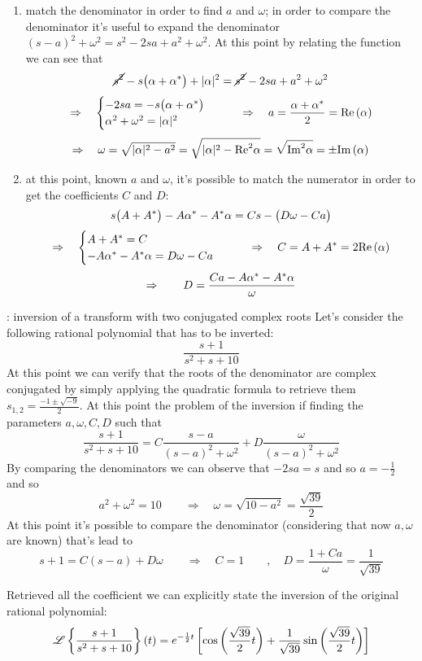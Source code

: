 	\begin{enumerate}
		\item match the denominator in order to find $a$ and $\omega$; in order to compare the denominator it's useful to expand the denominator $(s-a)^2 + \omega^2 = s^2  - 2sa + a^2 + \omega^2$. At this point by relating the function we can see that
		\[ \cancel {s^2} - s \big(\alpha+\alpha^*\big) + |\alpha|^2 = \cancel{s^2}  - 2sa + a^2 + \omega^2  \]
		\[ \Rightarrow \quad \begin{cases}
			-2sa = - s\big(\alpha + \alpha ^*\big) \\ \alpha^2+\omega^2 = |\alpha|^2 
		\end{cases} \qquad \Rightarrow \quad a = \frac{\alpha + \alpha^*}{2} = \textrm{Re}\left(\alpha\right) 	\]
		\[ \Rightarrow \quad \omega = \sqrt{|\alpha|^2-a^2}  = \sqrt{|\alpha|^2-\textrm{Re}^2\alpha} = \sqrt{\textrm{Im}^2\alpha} = \pm \textrm{Im}\left(\alpha\right)  \]
		
		\item at this point, known $a$ and $\omega$, it's possible to match the numerator in order to get the coefficients $C$ and $D$:
		\[ s\big(A+A^*\big) - A\alpha^* - A^*\alpha = Cs - \big(D\omega - Ca\big) \]
		\[ \Rightarrow \quad \begin{cases}
			A + A^* = C \\ -A\alpha^* - A^*\alpha = D\omega - Ca
		\end{cases} \qquad \Rightarrow \quad C = A+A^* = 2 \textrm{Re}\left(\alpha\right)\]
		\[ \Rightarrow \qquad D = \frac{Ca - A \alpha^*  - A^* \alpha}{\omega}  \]
	\end{enumerate}
	
	\begin{example}{: inversion of a transform with two conjugated complex roots}
		Let's consider the following rational polynomial that has to be inverted:
		\[ \frac{s+1}{s^2+s+10} \]
		At this point we can verify that the roots of the denominator are complex conjugated by simply applying the quadratic formula to retrieve them $s_{1,2} = \frac{-1\pm\sqrt{-9}}{2}$. At this point the problem of the inversion if finding the parameters $a,\omega,C,D$ such that
		\[ \frac{s+1}{s^2+s+10} = C \frac{s-a}{(s-a)^2+\omega^2} + D \frac{\omega}{(s-a)^2 + \omega^2} \]
		By comparing the denominators we can observe that $-2sa = s$ and so $a = -\frac 1 2$ and so 
		\[ a^2+ \omega^2 = 10 \qquad \Rightarrow \quad \omega = \sqrt{10-a^2} = \frac{\sqrt{39}}{2}\]
		At this point it's possible to compare the denominator (considering that now $a,\omega$ are known) that's lead to
		\[ s + 1 = C\left( s - a\right) + D\omega \qquad \Rightarrow \quad C = 1 \qquad,\quad D = \frac{1+Ca}{\omega} = \frac 1 {\sqrt{39}} \]
		
		Retrieved all the coefficient we can explicitly state the inversion of the original rational polynomial:
		\[ \mathscr{L} \left\{ \frac{s+1}{s^2+s+10}  \right\}(t) = e^{-\frac 1 2t} \left[ \cos\left( \frac{\sqrt{39}}{2} t \right) + \frac{1}{\sqrt{39}} \sin\left( \frac{\sqrt{39}}{2} t \right) \right] \]
	\end{example}
	
